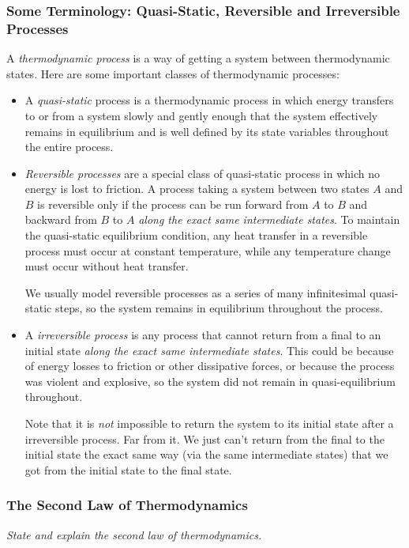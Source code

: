 \documentclass[11pt, a4paper]{article}
\begin{document}
\subsubsection{Some Terminology: Quasi-Static, Reversible and Irreversible Processes}
A \textit{thermodynamic process} is a way of getting a system between thermodynamic states. Here are some important classes of thermodynamic processes:
\begin{itemize}
	\item A \textit{quasi-static} process is a thermodynamic process in which energy transfers to or from a system slowly and gently enough that the system effectively remains in equilibrium and is well defined by its state variables throughout the entire process. 
	
	\item \textit{Reversible processes} are a special class of quasi-static process in which no energy is lost to friction. A process taking a system between two states $ A $ and $ B $ is reversible only if the process can be run forward from $ A $ to $ B $ and backward from $ B $ to $ A $ \textit{along the exact same intermediate states}. To maintain the quasi-static equilibrium condition, any heat transfer in a reversible process must occur at constant temperature, while any temperature change must occur without heat transfer.
	
	We usually model reversible processes as a series of many infinitesimal quasi-static steps, so the system remains in equilibrium throughout the process. 
	
	\item A \textit{irreversible process} is any process that cannot return from a final to an initial state \textit{along the exact same intermediate states}. This could be because of energy losses to friction or other dissipative forces, or because the process was violent and explosive, so the system did not remain in quasi-equilibrium throughout.
	
	Note that it is \textit{not} impossible to return the system to its initial state after a irreversible process. Far from it. We just can't return from the final to the initial state the exact same way (via the same intermediate states) that we got from the initial state to the final state.

	

\end{itemize}

\subsubsection{The Second Law of Thermodynamics}
\textit{State and explain the second law of thermodynamics.}
\end{document}
